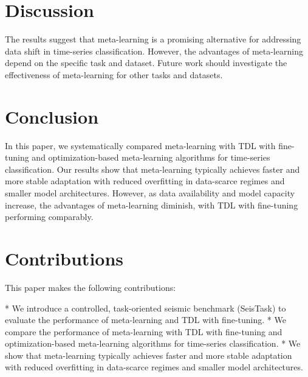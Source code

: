 \documentclass{article}
\begin{document}
\section{Discussion}
The results suggest that meta-learning is a promising alternative for addressing data shift in time-series classification. However, the advantages of meta-learning depend on the specific task and dataset. Future work should investigate the effectiveness of meta-learning for other tasks and datasets.

\section{Conclusion}
In this paper, we systematically compared meta-learning with TDL with fine-tuning and optimization-based meta-learning algorithms for time-series classification. Our results show that meta-learning typically achieves faster and more stable adaptation with reduced overfitting in data-scarce regimes and smaller model architectures. However, as data availability and model capacity increase, the advantages of meta-learning diminish, with TDL with fine-tuning performing comparably.

\section{Contributions}
This paper makes the following contributions:

* We introduce a controlled, task-oriented seismic benchmark (SeisTask) to evaluate the performance of meta-learning and TDL with fine-tuning.
* We compare the performance of meta-learning with TDL with fine-tuning and optimization-based meta-learning algorithms for time-series classification.
* We show that meta-learning typically achieves faster and more stable adaptation with reduced overfitting in data-scarce regimes and smaller model architectures.
\end{document}
